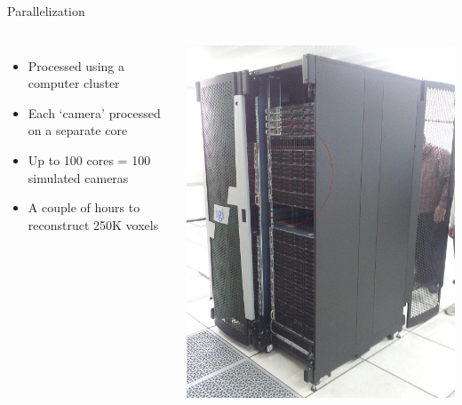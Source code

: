 \documentclass[compress,red,12pt]{beamer}
\begin{document}

\begin{frame}{Parallelization} 
  \begin{columns}
    \begin{itemize}
    \item Processed using a computer cluster
    \item Each `camera' processed on a separate core
    \item Up to 100 cores = 100 simulated cameras
    \item A couple of hours to reconstruct 250K voxels
    \end{itemize}

    \begin{center}
      \includegraphics[width=\columnwidth]{tamnun.jpg}
    \end{center}
  \end{columns}
\end{frame}
\end{document}
